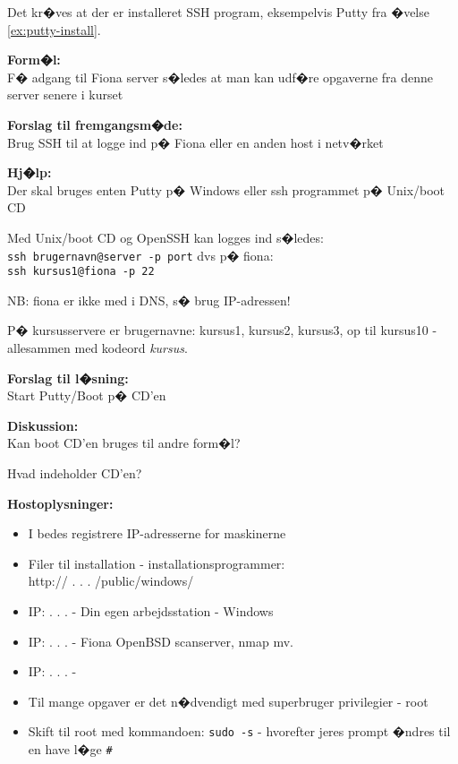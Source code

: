 \documentclass[a4paper,11pt,notitlepage]{oevelser}
\begin{document}
Det kr�ves at der er installeret SSH program, eksempelvis Putty fra
�velse \ref{ex:putty-install}.

{\bfseries Form�l:}\\
F� adgang til Fiona server s�ledes at man kan udf�re opgaverne fra denne server senere i kurset

{\bfseries Forslag til fremgangsm�de:}\\
Brug SSH til at logge ind p� Fiona eller en anden host i netv�rket

{\bfseries Hj�lp:}\\
Der skal bruges enten Putty p� Windows eller ssh programmet p� Unix/boot CD

Med Unix/boot CD og OpenSSH kan logges ind s�ledes:\\
\verb+ssh brugernavn@server -p port+ dvs p� fiona:\\
\verb+ssh kursus1@fiona -p 22+

NB: fiona er ikke med i DNS, s� brug IP-adressen!

P� kursusservere er brugernavne: kursus1, kursus2, kursus3, op til
kursus10 - allesammen med kodeord \emph{kursus}.


{\bfseries Forslag til l�sning:}\\
Start Putty/Boot p� CD'en

{\bfseries Diskussion:}\\
Kan boot CD'en bruges til andre form�l?

Hvad indeholder CD'en?

{\bfseries Hostoplysninger:}\\

\begin{itemize}
\item I bedes registrere IP-adresserne for maskinerne
\item Filer til installation - installationsprogrammer:\\
http:// \hskip 15mm .\hskip 15mm .\hskip 15mm .\hskip 15mm /public/windows/
\item IP: \hskip 15mm .\hskip 15mm .\hskip 15mm .\hskip 15mm - Din egen
  arbejdsstation - Windows
\item IP: \hskip 15mm .\hskip 15mm .\hskip 15mm .\hskip 15mm - Fiona
  OpenBSD scanserver, nmap mv.
\item IP: \hskip 15mm .\hskip 15mm .\hskip 15mm .\hskip 15mm -
\item Til mange opgaver er det n�dvendigt med superbruger privilegier
  - root
\item Skift til root med kommandoen: \verb+sudo -s+ - hvorefter jeres
  prompt �ndres til en have l�ge \verb+#+
\end{itemize}
\end{document}
